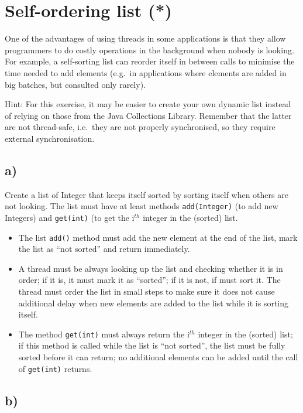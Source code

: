 \documentclass{article}
\begin{document}
\section{Self-ordering list (*)}
\label{sec:self-ordering-list}

One of the advantages of using threads in some applications is that
they allow programmers to do costly operations in the background when
nobody is looking. For example, a self-sorting list can reorder itself
in between calls to minimise the time needed to add elements (e.g.~in
applications where elements are added in big batches, but consulted
only rarely).

Hint: For this exercise, it may be easier to create your own dynamic
list instead of relying on those from the Java Collections
Library. Remember that the latter are not thread-safe, i.e.~they are
not properly synchronised, so they require external synchronisation. 

\subsection{a)}

Create a list of Integer that keeps itself sorted by sorting itself
when others are not looking. The list must have at least methods
\verb+add(Integer)+ (to add new Integers) and \verb+get(int)+ (to get
the i$^{th}$ integer in the (sorted) list. 

\begin{itemize}
\item The list \verb+add()+ method must add the new element at the end
  of the list, mark the list as ``not sorted'' and return immediately.
\item A thread must be always looking up the list and checking whether
  it is in order; if it is, it must mark it as ``sorted''; if it is
  not, if must sort it. The thread must order the list in small steps
  to make sure it does not cause additional delay when new elements
  are added to the list while it is sorting itself.
\item The method \verb+get(int)+ must always return the i$^{th}$
  integer in the (sorted) list; if this method is called while the
  list is ``not sorted'', the list must be fully sorted before it can
  return; no additional elements can be added until the call of
  \verb+get(int)+ returns.
\end{itemize}

\subsection{b)}
\label{sec:b}
\end{document}
